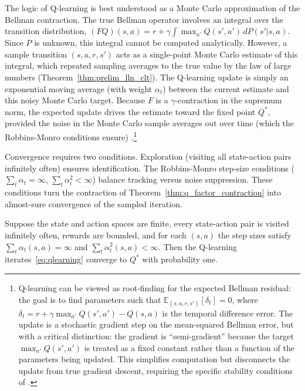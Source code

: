 The logic of Q-learning is best understood as a Monte Carlo approximation of the Bellman contraction. The true Bellman operator involves an integral over the transition distribution, $(FQ)(s,a) = r + \gamma \int \max_{a'} Q(s',a') \, dP(s'|s,a)$. Since $P$ is unknown, this integral cannot be computed analytically. However, a sample transition $(s,a,r,s')$ acts as a single-point Monte Carlo estimate of this integral, which repeated sampling averages to the true value by the law of large numbers (Theorem~\ref{thm:prelim_lln_clt}). The Q-learning update is simply an exponential moving average (with weight $\alpha_t$) between the current estimate and this noisy Monte Carlo target. Because $F$ is a $\gamma$-contraction in the supremum norm, the expected update drives the estimate toward the fixed point $Q^*$, provided the noise in the Monte Carlo sample averages out over time (which the Robbins-Monro conditions ensure) \citep{tsitsiklis1994}.\footnote{Q-learning can be viewed as root-finding for the expected Bellman residual: the goal is to find parameters such that $\mathbb{E}_{(s,a,r,s')}[\delta_t] = 0$, where $\delta_t = r + \gamma \max_{a'} Q(s',a') - Q(s,a)$ is the temporal difference error. The update is a stochastic gradient step on the mean-squared Bellman error, but with a critical distinction: the gradient is ``semi-gradient'' because the target $\max_{a'} Q(s',a')$ is treated as a fixed constant rather than a function of the parameters being updated. This simplifies computation but disconnects the update from true gradient descent, requiring the specific stability conditions of \citet{tsitsiklis1994}.}

Convergence requires two conditions. Exploration (visiting all state-action pairs infinitely often) ensures identification. The Robbins-Monro step-size conditions ($\sum_t \alpha_t = \infty$, $\sum_t \alpha_t^2 < \infty$) balance tracking versus noise suppression. These conditions turn the contraction of Theorem~\ref{thm:q_factor_contraction} into almost-sure convergence of the sampled iteration.

\begin{theorem}
\label{thm:qlearning_convergence}
Suppose the state and action spaces are finite, every state-action pair is visited infinitely often, rewards are bounded, and for each $(s,a)$ the step sizes satisfy $\sum_t \alpha_t(s,a) = \infty$ and $\sum_t \alpha_t^2(s,a) < \infty$. Then the Q-learning iterates~\eqref{eq:qlearning} converge to $Q^*$ with probability one.
\end{theorem}

